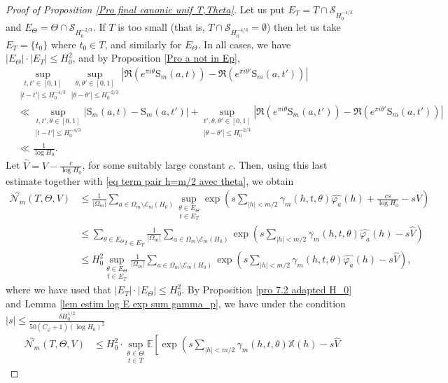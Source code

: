\documentclass[12pt]{amsart}
\theoremstyle{definition}
\numberwithin{equation}{section}
\numberwithin{equation}{section}
\def\E{\mathbb{E}}
\def\Ecal{\mathcal{E}}
\def\Ncal{\mathcal{N}}
\def\Scal{\mathcal{S}}
\def\B{\mathrm{S}}
\def\Mp{C_\varphi}
\def\X{\mathbb{X}}
\def\E{\mathbb{E}}
\begin{document}
\begin{proof}[Proof of Proposition \ref{Pro final canonic unif T,Theta}]
Let us put $ E_T =
T\cap \Scal_{H_0^{-4/3}}$ and $E_\Theta  = \Theta\cap \Scal_{H_0^{-2/3}}.$ If $T$ is too small (that is, $T\cap \Scal_{H_0^{-4/3}}=\emptyset$) then let us take $E_T = \{t_0\}$ where $t_0 \in T$, and similarly for $E_\Theta$. In all cases,
we have $ |E_\Theta|\cdot |E_T|\leq H_0^{2}$, and by
Proposition \ref{Pro a not in Ep}, 
\begin{align*}
    &\underset{|t-t'|\leq H_0^{-4/3}}{\sup_{t,t'\in [0,1]}}
    \underset{|\theta-\theta'|\leq H_0^{-2/3}}{\sup_{\theta,\theta'\in [0,1]}} \left|\Re\left(e^{\pi i\theta}\B_m(a,t)\right)-\Re\left(e^{\pi i\theta'}\B_m(a,t')\right)\right|\\
    &\ll 
    \underset{|t-t'|\leq H_0^{-4/3}}{\sup_{t,t',\theta \in [0,1]}}\left|\B_m(a,t)-\B_m(a,t')\right|+\underset{|\theta-\theta'|\leq H_0^{-2/3}}{\sup_{t',\theta,\theta'\in [0,1]}}
    \left|\Re\left(e^{\pi i\theta}\B_m(a,t')\right)-\Re\left(e^{\pi i\theta'}\B_m(a,t')\right)\right|\\
&\ll \frac{1}{\log H_0} .
\end{align*}
Let $\hat{V} = V- \frac{c}{\log H_0 }$, for some suitably large constant $c$. Then, using this last estimate together with \eqref{eq term pair h=m/2 avec theta}, we obtain
\begin{align*}
\overset{\sim}{\Ncal_m}(T,\Theta, V)
&\leq \frac{1}{|\Omega_m|}\sum_{a\in \Omega_m\setminus \Ecal_m(H_0)}
\underset{t\in E_T}{\sup_{\theta\in E_\Theta}}
\exp\left(
s \sum_{|h| < m/2}
\gamma_m(h,t,\theta)\widehat{\varphi_a}(h) +\frac{cs}{\log H_0 } -s V
\right)\\
&
\leq 
\underset{t\in E_T}{\sum_{\theta\in E_\Theta}}
\frac{1}{|\Omega_m|}\sum_{a\in \Omega_m\setminus \Ecal_m(H_0)}
\exp\left(
s \sum_{|h| < m/2}
\gamma_m(h,t,\theta)\widehat{\varphi_a}(h) -s\hat{V}
\right)\\
&\leq H_0^2
\underset{t\in E_T}{\sup_{\theta\in E_\Theta}}
\frac{1}{|\Omega_m|}\sum_{a\in \Omega_m\setminus \Ecal_m(H_0)}
\exp\left(
s \sum_{|h| < m/2}
\gamma_m(h,t,\theta)\widehat{\varphi_a}(h) -s\hat{V}
\right),
\end{align*}
where we have used that $
| E_T| \cdot|E_\Theta | 
\leq H_0^2.$
By Proposition \ref{pro 7.2 adapted H_0} and Lemma \ref{lem estim log E exp sum gamma_p}, we have under the condition $|s| \leq \frac{\delta H_0^{1/2} }{50(\Mp+1)(\log H_0)^2}$ 
\begin{align*}
\overset{\sim}{\Ncal_m}(T,\Theta, V)
&\leq H_0^2 \cdot
\underset{t\in T}{\sup_{\theta\in\Theta}}
\E\left[\exp\left(
s \sum_{|h| < m/2}
\gamma_m(h,t,\theta)\X(h) -s\hat{V}

\end{align*}
\end{proof}
\end{document}
